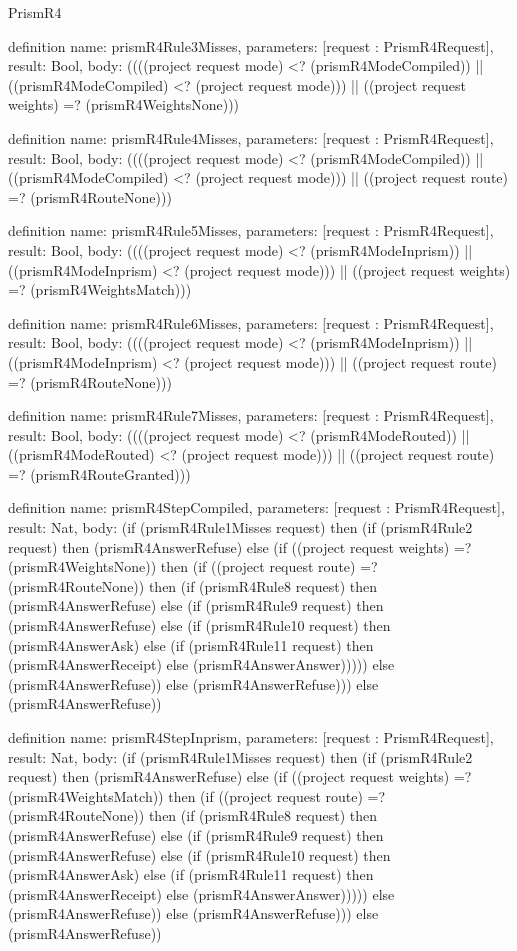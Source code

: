 \begin{lexlean}{PrismR4}
\begin{semanticmodule}
definition{
  name: prismR4Rule3Misses,
  parameters: [request : PrismR4Request],
  result: Bool,
  body: ((((project request mode) <? (prismR4ModeCompiled)) || ((prismR4ModeCompiled) <? (project request mode))) || ((project request weights) =? (prismR4WeightsNone)))
}

definition{
  name: prismR4Rule4Misses,
  parameters: [request : PrismR4Request],
  result: Bool,
  body: ((((project request mode) <? (prismR4ModeCompiled)) || ((prismR4ModeCompiled) <? (project request mode))) || ((project request route) =? (prismR4RouteNone)))
}

definition{
  name: prismR4Rule5Misses,
  parameters: [request : PrismR4Request],
  result: Bool,
  body: ((((project request mode) <? (prismR4ModeInprism)) || ((prismR4ModeInprism) <? (project request mode))) || ((project request weights) =? (prismR4WeightsMatch)))
}

definition{
  name: prismR4Rule6Misses,
  parameters: [request : PrismR4Request],
  result: Bool,
  body: ((((project request mode) <? (prismR4ModeInprism)) || ((prismR4ModeInprism) <? (project request mode))) || ((project request route) =? (prismR4RouteNone)))
}

definition{
  name: prismR4Rule7Misses,
  parameters: [request : PrismR4Request],
  result: Bool,
  body: ((((project request mode) <? (prismR4ModeRouted)) || ((prismR4ModeRouted) <? (project request mode))) || ((project request route) =? (prismR4RouteGranted)))
}

definition{
  name: prismR4StepCompiled,
  parameters: [request : PrismR4Request],
  result: Nat,
  body: (if (prismR4Rule1Misses request) then (if (prismR4Rule2 request) then (prismR4AnswerRefuse) else (if ((project request weights) =? (prismR4WeightsNone)) then (if ((project request route) =? (prismR4RouteNone)) then (if (prismR4Rule8 request) then (prismR4AnswerRefuse) else (if (prismR4Rule9 request) then (prismR4AnswerRefuse) else (if (prismR4Rule10 request) then (prismR4AnswerAsk) else (if (prismR4Rule11 request) then (prismR4AnswerReceipt) else (prismR4AnswerAnswer))))) else (prismR4AnswerRefuse)) else (prismR4AnswerRefuse))) else (prismR4AnswerRefuse))
}

definition{
  name: prismR4StepInprism,
  parameters: [request : PrismR4Request],
  result: Nat,
  body: (if (prismR4Rule1Misses request) then (if (prismR4Rule2 request) then (prismR4AnswerRefuse) else (if ((project request weights) =? (prismR4WeightsMatch)) then (if ((project request route) =? (prismR4RouteNone)) then (if (prismR4Rule8 request) then (prismR4AnswerRefuse) else (if (prismR4Rule9 request) then (prismR4AnswerRefuse) else (if (prismR4Rule10 request) then (prismR4AnswerAsk) else (if (prismR4Rule11 request) then (prismR4AnswerReceipt) else (prismR4AnswerAnswer))))) else (prismR4AnswerRefuse)) else (prismR4AnswerRefuse))) else (prismR4AnswerRefuse))
}


\end{semanticmodule}
\end{lexlean}
